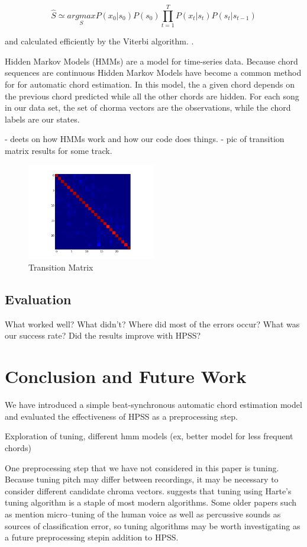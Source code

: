 \documentclass{article}
\begin{document}
$$\hat{S} \simeq  \underset{S}{argmax} P(x_{0}|s_{0}) P(s_{0}) \prod_{t=1}^{T} P(x_{t}|s_{t}) P(s_{t}|s_{t-1})$$

and calculated efficiently by the Viterbi algorithm. \cite{Ueda:01}.


Hidden Markov Models (HMMs) are a model for time-series data. Because chord sequences are continuous
Hidden Markov Models have become a common method for for automatic chord estimation. In this model, the
a given chord depends on the previous chord predicted while all the other chords are hidden. For each
song in our data set, the set of chorma vectors are the observations, while the chord labels are our states.

- deets on how HMMs work and how our code does things.
- pic of transition matrix results for some track.

\begin{figure}
   \centering
    \includegraphics[width=0.5\textwidth]{trans-h.png}
   \caption{Transition Matrix}
   \label{fig:trans-h}
\end{figure}

\subsection{Evaluation}

What worked well? What didn't? Where did most of the errors occur?
What was our success rate? Did the results improve with HPSS?

\section{Conclusion and Future Work}

We have introduced a simple beat-synchronous automatic chord estimation model
and evaluated the effectiveness of HPSS as a preprocessing step.

Exploration of tuning, different hmm models (ex, better model for less frequent chords)

One preprocessing step that we have not considered in this paper is tuning. Because tuning pitch
may differ between recordings, it may be necessary to consider different candidate chroma vectors.
\cite{McVicar:00} suggests that tuning using Harte's tuning algorithm is a staple of most modern
algorithms. Some older papers such as \cite{Zenz:20} mention micro--tuning of the human voice as well
as percussive sounds as sources of classification error, so tuning algorithms may be worth investigating
as a future preprocessing stepin addition to HPSS.
\end{document}
